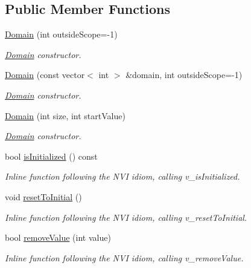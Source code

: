 \subsection*{Public Member Functions}
\begin{DoxyCompactItemize}
\item 
\hyperlink{classghost_1_1Domain_a48bfae90d7dbb6d8e1a3afdd8e471e4f}{Domain} (int outside\-Scope=-\/1)
\begin{DoxyCompactList}\small\item\em \hyperlink{classghost_1_1Domain}{Domain} constructor. \end{DoxyCompactList}\item 
\hyperlink{classghost_1_1Domain_a5277f6bd2940a87b4784834e93cb53c9}{Domain} (const vector$<$ int $>$ \&domain, int outside\-Scope=-\/1)
\begin{DoxyCompactList}\small\item\em \hyperlink{classghost_1_1Domain}{Domain} constructor. \end{DoxyCompactList}\item 
\hyperlink{classghost_1_1Domain_a6a9f7b0aec78acb0b0f4edefaea7a6e9}{Domain} (int size, int start\-Value)
\begin{DoxyCompactList}\small\item\em \hyperlink{classghost_1_1Domain}{Domain} constructor. \end{DoxyCompactList}\item 
bool \hyperlink{classghost_1_1Domain_a1ead2b1ccee560dac9ddb68c15362511}{is\-Initialized} () const 
\begin{DoxyCompactList}\small\item\em Inline function following the N\-V\-I idiom, calling v\-\_\-is\-Initialized. \end{DoxyCompactList}\item 
void \hyperlink{classghost_1_1Domain_a434b4c4fd270ee9be6853b330af9bad4}{reset\-To\-Initial} ()
\begin{DoxyCompactList}\small\item\em Inline function following the N\-V\-I idiom, calling v\-\_\-reset\-To\-Initial. \end{DoxyCompactList}\item 
bool \hyperlink{classghost_1_1Domain_a78a9ea39322c0a5984d62331c3c18756}{remove\-Value} (int value)
\begin{DoxyCompactList}\small\item\em Inline function following the N\-V\-I idiom, calling v\-\_\-remove\-Value. \end{DoxyCompactList}\item 

\end{DoxyCompactItemize}
